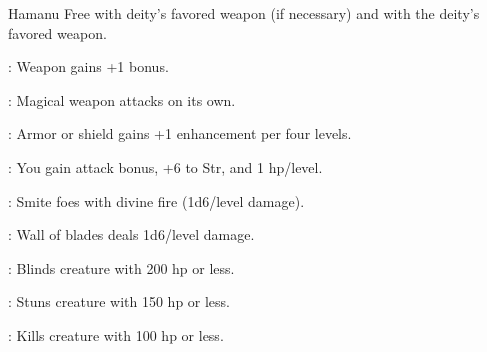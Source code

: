 {Hamanu}
{Free  with deity's favored weapon (if necessary) and  with the deity's favored weapon.}
{
	\item {}: Weapon gains +1 bonus.
	\item {}: Magical weapon attacks on its own.
	\item {}: Armor or shield gains +1 enhancement per four levels.
	\item {}: You gain attack bonus, +6 to Str, and 1 hp/level.
	\item {}: Smite foes with divine fire (1d6/level damage).
	\item {}: Wall of blades deals 1d6/level damage.
	\item {}: Blinds creature with 200 hp or less.
	\item {}: Stuns creature with 150 hp or less.
	\item {}: Kills creature with 100 hp or less.
}
